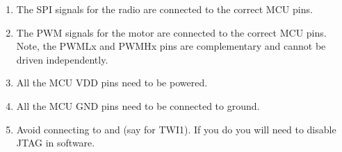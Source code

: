 \begin{enumerate}
\item
  The SPI signals for the radio are connected to the correct MCU pins.
\item
  The PWM signals for the motor are connected to the correct MCU pins.
  Note, the PWMLx and PWMHx pins are complementary and cannot be driven
  independently.
\item
  All the MCU VDD pins need to be powered.
\item
  All the MCU GND pins need to be connected to ground.
\item
  Avoid connecting to  and  (say for TWI1).  If you
  do you will need to disable JTAG in software.
\end{enumerate}
